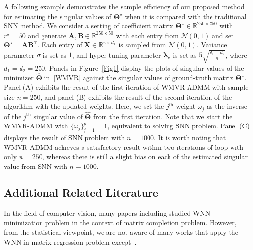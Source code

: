 \documentclass[alpha-refs]{wiley-article}
\begin{document}
A following example demonstrates the sample efficiency of our proposed method for estimating the singular values of $\boldsymbol{\Theta^{\star}}$ when it is compared with the traditional SNN method.
We consider a setting of coefficient matrix $\boldsymbol{\Theta}^{\star}\in\mathbb{R}^{250 \times 250}$ with $r^{\star}=50$ and generate $\boldsymbol{A}, \boldsymbol{B} \in \mathbb{R}^{250 \times 50}$ with each entry from $\mathcal{N}(0,1)$ and set $\boldsymbol{\Theta}^{\star}=\boldsymbol{AB^{\top}}$.
Each entry of $\boldsymbol{X}\in\mathbb{R}^{n \times d_{1}}$ is sampled from $\mathcal{N}(0,1)$.
Variance parameter $\sigma$ is set as $1$, and hyper-tuning parameter $\boldsymbol{\lambda}_{n}$ is set as $5\sqrt{\frac{d_{1}+d_{2}}{n}}$, where $d_{1}=d_{2}=250$.
Panels in Figure~\ref{Fig1} display the plots of singular values of the minimizer $\widehat{\boldsymbol{\Theta}}$ in~\eqref{WMVR} against the singular values of ground-truth matrix $\boldsymbol{\Theta^{\star}}$.
Panel (A) exhibits the result of the first iteration of WMVR-ADMM with sample size $n=250$, and panel (B) exhibits the result of the second iteration of the algorithm with the updated weights.
Here, we set the $j^{\text{th}}$ weight $\omega_{j}$ as the inverse of the $j^{\text{th}}$ singular value of $\widehat{\boldsymbol{\Theta}}$ from the first iteration.
Note that we start the WMVR-ADMM with $\{\omega_{j}\}_{j=1}^{p}=1$, equivalent to solving SNN problem.
Panel (C) displays the result of SNN problem with $n=1000$.
It is worth noting that WMVR-ADMM achieves a satisfactory result within two iterations of loop with only $n=250$, whereas there is still a slight bias on each of the estimated singular value from SNN with $n=1000$.

\subsection{Additional Related Literature}
In the field of computer vision, many papers including \citet{gu2014weighted,gu2017weighted,xu2017multi,yair2018multi,liu2018speckle,kim2020cauchy} studied WNN minimization problem in the context of matrix completion problem.
However, from the statistical viewpoint, we are not aware of many works that apply the WNN in matrix regression problem except~\citet{chen2013reduced}.
\end{document}
